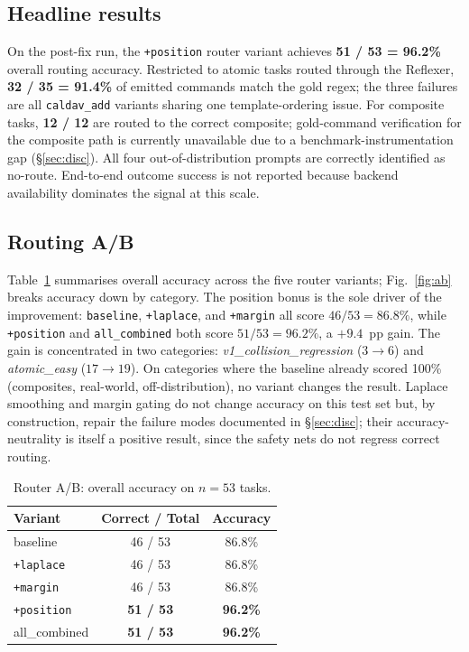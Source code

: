 \label{sec:eval}

\subsection{Headline results}
On the post-fix run, the \texttt{+position} router variant achieves \textbf{51 / 53 = 96.2\%} overall routing accuracy. Restricted to atomic tasks routed through the Reflexer, \textbf{32 / 35 = 91.4\%} of emitted commands match the gold regex; the three failures are all \texttt{caldav\_add} variants sharing one template-ordering issue. For composite tasks, \textbf{12 / 12} are routed to the correct composite; gold-command verification for the composite path is currently unavailable due to a benchmark-instrumentation gap (\S\ref{sec:disc}). All four out-of-distribution prompts are correctly identified as no-route. End-to-end outcome success is not reported because backend availability dominates the signal at this scale.

\subsection{Routing A/B}
Table~\ref{tab:ab} summarises overall accuracy across the five router variants; Fig.~\ref{fig:ab} breaks accuracy down by category. The position bonus is the sole driver of the improvement: \texttt{baseline}, \texttt{+laplace}, and \texttt{+margin} all score $46 / 53 = 86.8\%$, while \texttt{+position} and \texttt{all\_combined} both score $51 / 53 = 96.2\%$, a $+9.4$~pp gain. The gain is concentrated in two categories: \emph{v1\_collision\_regression} ($3 \to 6$) and \emph{atomic\_easy} ($17 \to 19$). On categories where the baseline already scored 100\% (composites, real-world, off-distribution), no variant changes the result. Laplace smoothing and margin gating do not change accuracy on this test set but, by construction, repair the failure modes documented in \S\ref{sec:disc}; their accuracy-neutrality is itself a positive result, since the safety nets do not regress correct routing.

\begin{table}[t]
  \centering
  \caption{Router A/B: overall accuracy on $n{=}53$ tasks.}
  \label{tab:ab}
  \small
  \begin{tabular}{lcc}
    \toprule
    Variant & Correct / Total & Accuracy \\
    \midrule
    baseline       & 46 / 53 & 86.8\% \\
    \texttt{+laplace}    & 46 / 53 & 86.8\% \\
    \texttt{+margin}     & 46 / 53 & 86.8\% \\
    \texttt{+position}   & \textbf{51 / 53} & \textbf{96.2\%} \\
    all\_combined   & \textbf{51 / 53} & \textbf{96.2\%} \\
    \bottomrule
  \end{tabular}
\end{table}

